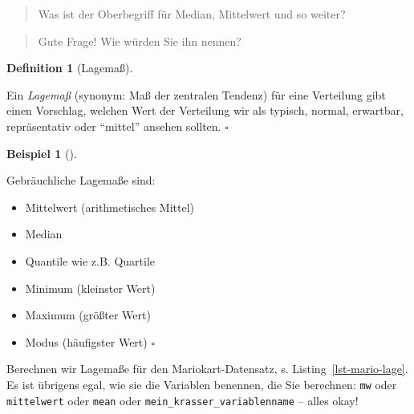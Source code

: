 \documentclass[
  letterpaper,
]{scrbook}
\providecommand{\tightlist}{%
  \setlength{\itemsep}{0pt}\setlength{\parskip}{0pt}}\usepackage{longtable,booktabs,array}
\theoremstyle{definition}
\theoremstyle{definition}
\newtheorem{example}{Beispiel}[chapter]
\theoremstyle{definition}
\newtheorem{definition}{Definition}[chapter]
\theoremstyle{remark}
\begin{document}
\begin{quote}
{} Was ist der Oberbegriff für Median, Mittelwert und so
weiter?
\end{quote}

\begin{quote}
{} Gute Frage! Wie würden Sie ihn nennen?
\end{quote}

\begin{definition}[Lagemaß]\protect\hypertarget{def-lage}{}\label{def-lage}

Ein \emph{Lagemaß} (synonym: Maß der zentralen Tendenz) für eine
Verteilung gibt einen Vorschlag, welchen Wert der Verteilung wir als
typisch, normal, erwartbar, repräsentativ oder \enquote{mittel} ansehen
sollten. \(\square\)

\end{definition}

\begin{example}[]\protect\hypertarget{exm-lagemaße}{}\label{exm-lagemaße}

Gebräuchliche Lagemaße sind:

\begin{itemize}
\tightlist
\item
  Mittelwert (arithmetisches Mittel)
\item
  Median
\item
  Quantile wie z.B. Quartile
\item
  Minimum (kleinster Wert)
\item
  Maximum (größter Wert)
\item
  Modus (häufigster Wert) \(\square\)
\end{itemize}

\end{example}

Berechnen wir Lagemaße für den Mariokart-Datensatz, s.
Listing~\ref{lst-mario-lage}. Es ist übrigens egal, wie sie die
Variablen benennen, die Sie berechnen: \texttt{mw} oder
\texttt{mittelwert} oder \texttt{mean} oder
\texttt{mein\_krasser\_variablenname} -- alles okay!
\end{document}
